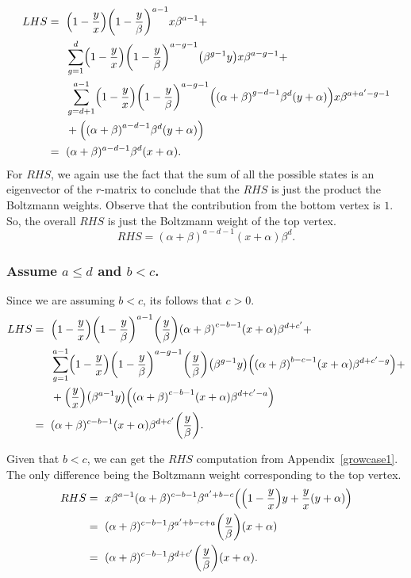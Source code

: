 \documentclass[ALCO, Unicode]{cedram}
\DeclarePairedDelimiter\autobracket{(}{)}
\newcommand{\br}[1]{\autobracket*{#1}}
\begin{document}
{\allowdisplaybreaks
\begin{align*}
  LHS   =\text{ }& \br{1-\dfrac{y}{x}} \br{1-\dfrac {y}{\beta}}^{a-1}  x\beta^{a-1}+\\
              & \sum^{d}_{g=1} \br{1-\dfrac{y}{x}} \br{1-\dfrac {y}{\beta}}^{a-g-1}  \br{\beta^{g-1}y}  x\beta^{a-g-1}+\\
              &\sum^{a-1}_{g=d+1} \br{1-\dfrac{y}{x}} \br{1-\dfrac {y}{\beta}}^{a-g-1}  \br{\br{\alpha+\beta}^{g-d-1}\beta^{d}\br{y+\alpha}}  x\beta^{a+a'-g-1}\\
              &+\br{\br{\alpha+\beta}^{a-d-1}\beta^{d}\br{y+\alpha}}\\
    =\text{ }& (\alpha+\beta)^{a-d-1}\beta^{d}(x+\alpha).          
\end{align*}
}
For $RHS$, we again use the fact that the sum of all the possible states is an eigenvector of the $r$-matrix to conclude that the $RHS$ is just the product the Boltzmann weights. Observe that the contribution from the bottom vertex is $1$. So, the overall $RHS$ is just the Boltzmann weight of the top vertex.
\[
RHS=(\alpha+\beta)^{a-d-1}(x+\alpha)\beta^{d}.
\]


\subsubsection{Assume \texorpdfstring{$a\leq d$ and $b<c$}{a<=d and b<c}.}
Since we are assuming $b<c$, its follows that $c>0$.
\label{growcase3}
{\allowdisplaybreaks
\begin{align*}
  LHS   =\text{ }& \br{1-\dfrac{y}{x}} \br{1-\dfrac {y}{\beta}}^{a-1} \br{\dfrac{y}{\beta}} \br{\alpha+\beta}^{c-b-1}\br{x+\alpha}\beta^{d+c'}+\\
              & \sum^{a-1}_{g=1} \br{1-\dfrac{y}{x}} \br{1-\dfrac {y}{\beta}}^{a-g-1} \br{\dfrac{y}{\beta}} \br{\beta^{g-1}y} \br{\br{\alpha+\beta}^{b-c-1}\br{x+\alpha}\beta^{d+c'-g}}+\\
              &+\br{\dfrac{y}{x}}\br{\beta^{a-1}y} \br{\br{\alpha+\beta}^{c-b-1}\br{x+\alpha}\beta^{d+c'-a}}\\
     =\text{ }&(\alpha+\beta)^{c-b-1}(x+\alpha)\beta^{d+c'}\br{\dfrac{y}{\beta}}.       
\end{align*}
}

Given that $b<c$, we can get the $RHS$ computation from Appendix~\ref{growcase1}. The only difference being the Boltzmann weight corresponding to the top vertex.
\begin{align*}
RHS =\text{ }& x\beta^{a-1} (\alpha+\beta)^{c-b-1}\beta^{a'+b-c} \br{\br{1-\dfrac{y}{x}}y+ \dfrac{y}{x}(y+\alpha)}\\ 
 =\text{ }& (\alpha+\beta)^{c-b-1}\beta^{a'+b-c+a}\br{\dfrac{y}{\beta}}(x+\alpha)\\
 =\text{ }& (\alpha+\beta)^{c-b-1}\beta^{d+c'}\br{\dfrac{y}{\beta}}(x+\alpha).
\end{align*}
\end{document}
